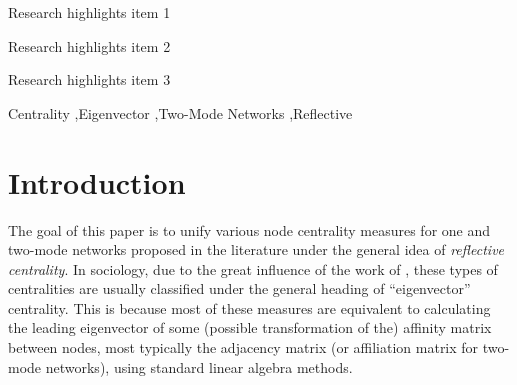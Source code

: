\documentclass[a4paper,fleqn]{cas-sc}
\begin{document}
\begin{abstract}
This template helps you to create a properly formatted \LaTeX\ manuscript.

\noindent\texttt{\textbackslash begin{abstract}} \dots 
\texttt{\textbackslash end{abstract}} and
\verb+\begin{keyword}+ \verb+...+ \verb+\end{keyword}+ 
which
contain the abstract and keywords respectively. 

\noindent Each keyword shall be separated by a \verb+\sep+ command.
\end{abstract}


\begin{highlights}
\item Research highlights item 1
\item Research highlights item 2
\item Research highlights item 3
\end{highlights}

\begin{keywords}
Centrality \sep Eigenvector \sep Two-Mode Networks \sep Reflective
\end{keywords}


\maketitle

\section{Introduction}
The goal of this paper is to unify various node centrality measures for one and two-mode networks proposed in the literature under the general idea of \textit{reflective centrality}. In sociology, due to the great influence of the work of \citet{bonacich72, bonacich87, bonacich91, bonacich_lloyd01}, these types of centralities are usually classified under the general heading of ``eigenvector'' centrality. This is because most of these measures are equivalent to calculating the leading eigenvector of some (possible transformation of the) affinity matrix between nodes, most typically the adjacency matrix (or affiliation matrix for two-mode networks), using standard linear algebra methods. 
\end{document}
